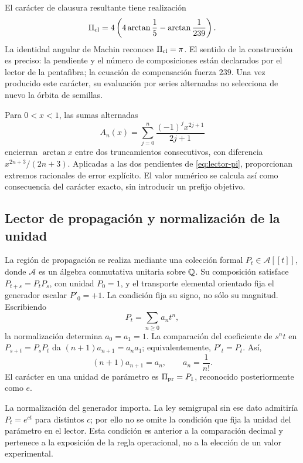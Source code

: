El carácter de clausura resultante tiene realización
\begin{equation}
 \Pi_{\rm cl}=4\left(4\arctan\frac15-\arctan\frac1{239}\right).
 \label{eq:lector-pi}
\end{equation}
La identidad angular de Machin reconoce \(\Pi_{\rm cl}=\pi\). El sentido de la construcción es preciso: la pendiente y el número de composiciones están declarados por el lector de la pentafibra; la ecuación de compensación fuerza \(239\). Una vez producido este carácter, su evaluación por series alternadas no selecciona de nuevo la órbita de semillas.

Para \(0<x<1\), las sumas alternadas
\[
 A_n(x)=\sum_{j=0}^n\frac{(-1)^jx^{2j+1}}{2j+1}
\]
encierran \(\arctan x\) entre dos truncamientos consecutivos, con diferencia \(x^{2n+3}/(2n+3)\). Aplicadas a las dos pendientes de \eqref{eq:lector-pi}, proporcionan extremos racionales de error explícito. El valor numérico se calcula así como consecuencia del carácter exacto, sin introducir un prefijo objetivo.

\subsection{Lector de propagación y normalización de la unidad}

La región de propagación se realiza mediante una colección formal \(P_t\in\mathcal A[[t]]\), donde \(\mathcal A\) es un álgebra conmutativa unitaria sobre \(\mathbb Q\). Su composición satisface \(P_{t+s}=P_tP_s\), con unidad \(P_0=1\), y el transporte elemental orientado fija el generador escalar \(P'_0=+1\). La condición fija su signo, no sólo su magnitud. Escribiendo
\[
 P_t=\sum_{n\ge0}a_nt^n,
\]
la normalización determina \(a_0=a_1=1\). La comparación del coeficiente de \(s^nt\) en \(P_{s+t}=P_sP_t\) da \((n+1)a_{n+1}=a_na_1\); equivalentemente, \(P'_t=P_t\). Así,
\begin{equation}
 (n+1)a_{n+1}=a_n,\qquad a_n=\frac1{n!}.
 \label{eq:propagacion}
\end{equation}
El carácter en una unidad de parámetro es \(\Pi_{\rm pr}=P_1\), reconocido posteriormente como \(e\).

La normalización del generador importa. La ley semigrupal sin ese dato admitiría \(P_t=e^{ct}\) para distintos \(c\); por ello no se omite la condición que fija la unidad del parámetro en el lector. Esta condición es anterior a la comparación decimal y pertenece a la exposición de la regla operacional, no a la elección de un valor experimental.

